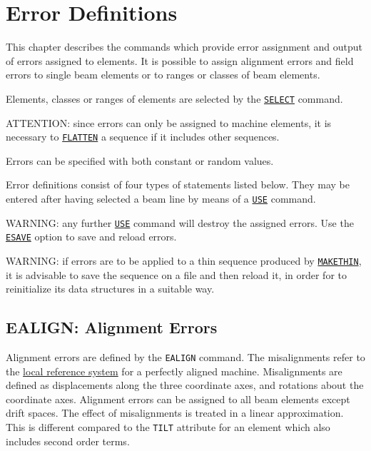 
\chapter{Error Definitions}
\label{chap:error}
This chapter describes the commands which provide error assignment and
output of errors assigned to elements. It is possible to assign
alignment errors and field errors to single beam elements or to ranges
or classes of beam elements.

Elements, classes or ranges of elements are selected by the
\hyperref[sec:select]{\texttt{SELECT}} command.

ATTENTION: since errors can only be assigned to machine elements, it is
necessary to \hyperref[sec:flatten]{\texttt{FLATTEN}} a sequence
if it includes other sequences.

Errors can be specified with both constant or random values.

Error definitions consist of four types of statements listed below. They
may be entered after having selected a beam line by means of a
\hyperref[sec:use]{\texttt{USE}} command.  

WARNING: any further \hyperref[sec:use]{\texttt{USE}} command
will destroy the assigned errors. Use the
\hyperref[sec:esave]{\texttt{ESAVE}} option to save and reload errors.

WARNING: if errors are to be applied to a thin sequence produced by \hyperref[chap:makethin]{\texttt{MAKETHIN}}, it is advisable to save the sequence on a file and then reload it, in order for \madx to reinitialize its data structures in a suitable way.



%

\section{EALIGN: Alignment Errors} %
\label{sec:ealign}

Alignment errors are defined by the \texttt{EALIGN} command. 
The misalignments refer to the
\hyperref[sec:reference]{local reference system} for a
perfectly aligned machine.  
Misalignments are defined as displacements along the three coordinate
axes, and rotations about the coordinate axes. 
Alignment errors can be assigned to all beam elements except drift
spaces. 
The effect of misalignments is treated in a linear
approximation. This is different compared to the \texttt{TILT} attribute for an element which also includes second order terms.

